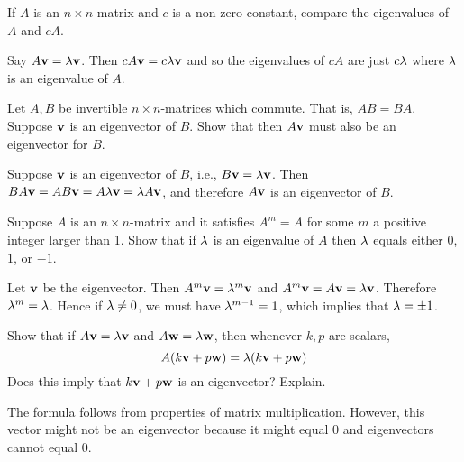 \begin{ex}
  If $A$ is an $n\times n$-matrix and $c$ is a non-zero constant,
  compare the eigenvalues of $A$ and $cA$.
  \begin{sol}
    Say $A\vect{v}=\eigenvar \vect{v}$. Then
    $ cA\vect{v}=c\eigenvar \vect{v}$ and so the eigenvalues of $cA$ are
    just $ c\lambda $ where $\lambda $ is an eigenvalue of $A$.
  \end{sol}
\end{ex}

\begin{ex}
  Let $A,B$ be invertible $n\times n$-matrices which commute. That is,
  $AB=BA$. Suppose $\vect{v}$ is an eigenvector of $B$. Show that then
  $A\vect{v}$ must also be an eigenvector for $B$.
  \begin{sol}
    Suppose $\vect{v}$ is an eigenvector of $B$, i.e.,
    $B\vect{v}=\eigenvar \vect{v}$. Then
    $BA\vect{v}=AB\vect{v} =A\eigenvar \vect{v}=\eigenvar A\vect{v}$,
    and therefore $A\vect{v}$ is an eigenvector of $B$.
  \end{sol}
\end{ex}

\begin{ex}
  Suppose $A$ is an $n\times n$-matrix and it satisfies $A^{m}=A$ for
  some $m$ a positive integer larger than 1. Show that if $\lambda $
  is an eigenvalue of $A$ then $\lambda$ equals either $0$, $1$, or
  $-1$.
  \begin{sol}
    Let $\vect{v}$ be the eigenvector. Then
    $A^{m}\vect{v}=\eigenvar^{m}\vect{v}$ and
    $A^{m}\vect{v}=A\vect{v}=\eigenvar\vect{v}$. Therefore
    $\lambda^{m}=\lambda$. Hence if $\lambda \neq 0$, we must
    have $\lambda^{m-1}=1$, which implies that $\lambda=\pm 1$.
  \end{sol}
\end{ex}

\begin{ex}
  Show that if $A\vect{v}=\eigenvar \vect{v}$ and
  $A\vect{w}=\eigenvar \vect{w}$, then whenever $k,p$ are scalars,
  \begin{equation*}
    A(k\vect{v}+p\vect{w}) =\eigenvar (k\vect{v}+p\vect{w})
  \end{equation*}
  Does this imply that $k\vect{v}+p\vect{w}$ is an eigenvector? Explain.
  \begin{sol}
    The formula follows from properties of matrix
    multiplication. However, this vector might not be an eigenvector
    because it might equal $0$ and eigenvectors cannot equal $0$.
  \end{sol}
\end{ex}

